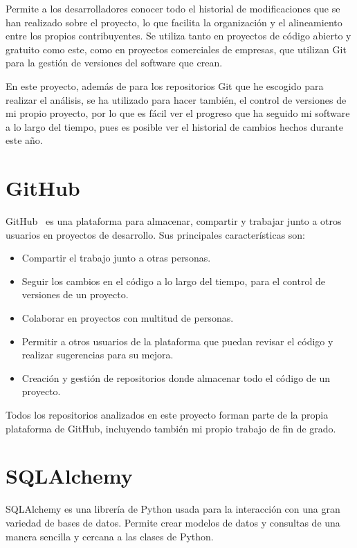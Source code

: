 \documentclass[a4paper, 12pt]{book}
\begin{document}
Permite a los desarrolladores conocer todo el historial de modificaciones que se han realizado sobre el proyecto, lo que facilita la organización y el alineamiento entre los propios contribuyentes. Se utiliza tanto en proyectos de código abierto y gratuito como este, como en proyectos comerciales de empresas, que utilizan Git para la gestión de versiones del software que crean.


En este proyecto, además de para los repositorios Git que he escogido para realizar el análisis, se ha utilizado para hacer también, el control de versiones de mi propio proyecto, por lo que es fácil ver el progreso que ha seguido mi software a lo largo del tiempo, pues es posible ver el historial de cambios hechos durante este año. 

\section{GitHub}
\label{sec:GitHub}

GitHub~\cite{github:_github}  es una plataforma para almacenar, compartir y trabajar junto a otros usuarios en proyectos de desarrollo. Sus principales características son:

\begin{itemize}
  \item Compartir el trabajo junto a otras personas.
  \item Seguir los cambios en el código a lo largo del tiempo, para el control de versiones de un proyecto.
  \item Colaborar en proyectos con multitud de personas.
  \item Permitir a otros usuarios de la plataforma que puedan revisar el código y realizar sugerencias para su mejora.
  \item Creación y gestión de repositorios donde almacenar todo el código de un proyecto.
\end{itemize}

Todos los repositorios analizados en este proyecto forman parte de la propia plataforma de GitHub, incluyendo también mi propio trabajo de fin de grado.

\section{SQLAlchemy}
\label{sec:SQLAlchemy}

SQLAlchemy es una librería de Python usada para la interacción con una gran variedad de bases de datos. Permite crear modelos de datos y consultas de una manera sencilla y cercana a las clases de Python.
\end{document}
